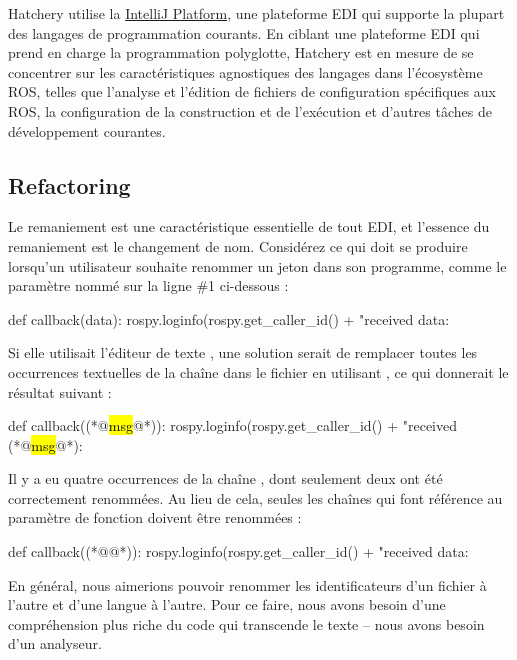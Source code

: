 {Hatchery utilise la \href{https://www.jetbrains.org/intellij/sdk/docs/}{IntelliJ Platform}, une plateforme EDI qui supporte la plupart des langages de programmation courants. En ciblant une plateforme EDI qui prend en charge la programmation polyglotte, Hatchery est en mesure de se concentrer sur les caractéristiques agnostiques des langages dans l'écosystème ROS, telles que l'analyse et l'édition de fichiers de configuration spécifiques aux ROS, la configuration de la construction et de l'exécution et d'autres tâches de développement courantes.

\subsection{Refactoring}\label{subsec:refactoring}

Le remaniement est une caractéristique essentielle de tout EDI, et l'essence du remaniement est le changement de nom. Considérez ce qui doit se produire lorsqu'un utilisateur souhaite renommer un jeton dans son programme, comme le paramètre nommé  sur la ligne \#1 ci-dessous :
%
\begin{pythonlisting}
def callback(data):
    rospy.loginfo(rospy.get_caller_id() + "received data: %
\end{pythonlisting}
%
Si elle utilisait l'éditeur de texte , une solution serait de remplacer toutes les occurrences textuelles de la chaîne  dans le fichier en utilisant , ce qui donnerait le résultat suivant :

\begin{pythonlisting}
def callback((*@\hl{msg}@*)):
    rospy.loginfo(rospy.get_caller_id() + "received (*@\hl{msg}@*): %
\end{pythonlisting}
%
Il y a eu quatre occurrences de la chaîne , dont seulement deux ont été correctement renommées. Au lieu de cela, seules les chaînes qui font référence au paramètre de fonction doivent être renommées :

\newcommand{\cfbox}[2]{\colorlet{\currentcolor}{.}{\color{#1}\fbox{\color{\currentcolor}#2}}}

\begin{pythonlisting}
def callback((*@\cfbox{red}{data}@*)):
    rospy.loginfo(rospy.get_caller_id() + "received data: %
\end{pythonlisting}
%
En général, nous aimerions pouvoir renommer les identificateurs d'un fichier à l'autre et d'une langue à l'autre. Pour ce faire, nous avons besoin d'une compréhension plus riche du code qui transcende le texte -- nous avons besoin d'un analyseur.

}
